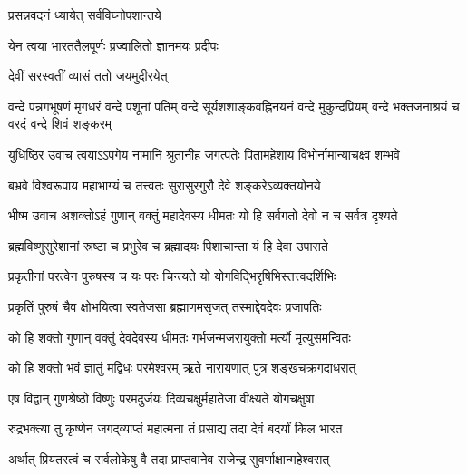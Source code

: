 
{प्रसन्नवदनं ध्यायेत् सर्वविघ्नोपशान्तये}

{येन त्वया भारततैलपूर्णः प्रज्वालितो ज्ञानमयः प्रदीपः}%


{देवीं सरस्वतीं व्यासं ततो जयमुदीरयेत्}


{वन्दे पन्नगभूषणं मृगधरं वन्दे पशूनां पतिम्}
{वन्दे सूर्यशशाङ्कवह्निनयनं वन्दे मुकुन्दप्रियम्}
{वन्दे भक्तजनाश्रयं च वरदं वन्दे शिवं शङ्करम्}


युधिष्ठिर उवाच\nopagebreak[4]
\twolineshloka
{त्वयाऽऽपगेय नामानि श्रुतानीह जगत्पतेः}%
{पितामहेशाय विभोर्नामान्याचक्ष्व शम्भवे}%

\twolineshloka
{बभ्रवे विश्वरूपाय महाभाग्यं च तत्त्वतः}%
{सुरासुरगुरौ देवे शङ्करेऽव्यक्तयोनये}%

भीष्म उवाच\nopagebreak[4]
\twolineshloka
{अशक्तोऽहं गुणान् वक्तुं महादेवस्य धीमतः}%
{यो हि सर्वगतो देवो न च सर्वत्र दृश्यते}%

\twolineshloka
{ब्रह्मविष्णुसुरेशानां स्रष्टा च प्रभुरेव च}%
{ब्रह्मादयः पिशाचान्ता यं हि देवा उपासते}%

\twolineshloka
{प्रकृतीनां परत्वेन पुरुषस्य च यः परः}%
{चिन्त्यते यो योगविद्भिरृषिभिस्तत्त्वदर्शिभिः}%

\twolineshloka
{प्रकृतिं पुरुषं चैव क्षोभयित्वा स्वतेजसा}%
{ब्रह्माणमसृजत् तस्माद्देवदेवः प्रजापतिः}%


\twolineshloka
{को हि शक्तो गुणान् वक्तुं देवदेवस्य धीमतः}%
{गर्भजन्मजरायुक्तो मर्त्यो मृत्युसमन्वितः}%

\twolineshloka
{को हि शक्तो भवं ज्ञातुं मद्विधः परमेश्वरम्}%
{ऋते नारायणात् पुत्र शङ्खचक्रगदाधरात्}%

\twolineshloka
{एष विद्वान् गुणश्रेष्ठो विष्णुः परमदुर्जयः}%
{दिव्यचक्षुर्महातेजा वीक्ष्यते योगचक्षुषा}%

\twolineshloka
{रुद्रभक्त्या तु कृष्णेन जगद्‌व्याप्तं महात्मना}%
{तं प्रसाद्य तदा देवं बदर्यां किल भारत}%

\twolineshloka
{अर्थात् प्रियतरत्वं च सर्वलोकेषु वै तदा}%
{प्राप्तवानेव राजेन्द्र सुवर्णाक्षान्महेश्वरात्}%

